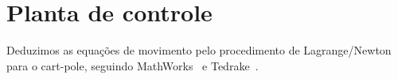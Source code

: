 \documentclass[brazil, 12pt]{article}
\begin{document}
\section{Planta de controle}

Deduzimos as equações de movimento pelo procedimento de Lagrange/Newton para o
cart-pole, seguindo MathWorks~\cite{mathworks} e Tedrake~\cite{mit}.


\vspace{0.4cm}
\end{document}
